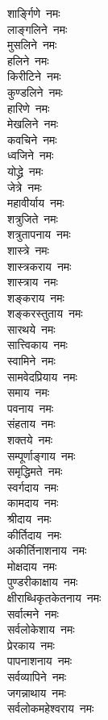 \begin{multicols}{2}
\begin{flushleft}
शार्ङ्गिणे~नमः\\
लाङ्गलिने~नमः\\
मुसलिने~नमः\\
हलिने~नमः\hfill{}\\
किरीटिने~नमः\\
कुण्डलिने~नमः\\
हारिणे~नमः\\
मेखलिने~नमः\\
कवचिने~नमः\\
ध्वजिने~नमः\\
योद्ध्रे~नमः\\
जेत्रे~नमः\\
महावीर्याय~नमः\\
शत्रुजिते~नमः\hfill{}\\
शत्रुतापनाय~नमः\\
शास्त्रे~नमः\\
शास्त्रकराय~नमः\\
शास्त्राय~नमः\\
शङ्कराय~नमः\\
शङ्करस्तुताय~नमः\\
सारथये~नमः\\
सात्त्विकाय~नमः\\
स्वामिने~नमः\\
सामवेदप्रियाय~नमः\hfill{}\\
समाय~नमः\\
पवनाय~नमः\\
संहताय~नमः\\
शक्तये~नमः\\
सम्पूर्णाङ्गाय~नमः\\
समृद्धिमते~नमः\\
स्वर्गदाय~नमः\\
कामदाय~नमः\\
श्रीदाय~नमः\\
कीर्तिदाय~नमः\hfill{}\\
अकीर्तिनाशनाय~नमः\\
मोक्षदाय~नमः\\
पुण्डरीकाक्षाय~नमः\\
क्षीराब्धिकृतकेतनाय~नमः\\
सर्वात्मने~नमः\\
सर्वलोकेशाय~नमः\\
प्रेरकाय~नमः\\
पापनाशनाय~नमः\\
सर्वव्यापिने~नमः\\
जगन्नाथाय~नमः\hfill{}\\
सर्वलोकमहेश्वराय~नमः\\

\end{flushleft}
\end{multicols}
